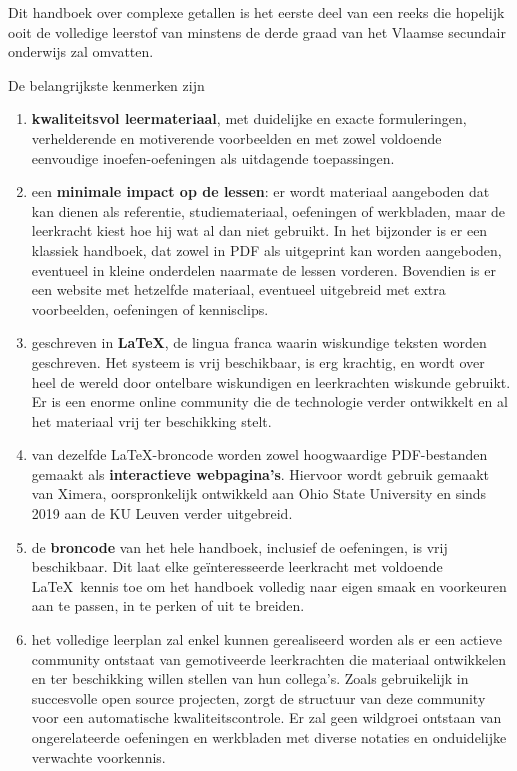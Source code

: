 \documentclass{ximera}
\begin{document}
	\author{Wim Obbels}
	\label{xim:xuitleg_leerkrachten}

    Dit handboek over complexe getallen is het eerste deel van een reeks die hopelijk ooit de volledige leerstof van minstens de derde graad van het Vlaamse secundair onderwijs zal omvatten.

    De belangrijkste kenmerken zijn
    \begin{enumerate}
        \item \textbf{kwaliteitsvol leermateriaal}, met duidelijke en exacte formuleringen, verhelderende en motiverende voorbeelden en met zowel voldoende eenvoudige inoefen-oefeningen als uitdagende toepassingen.
        \item een \textbf{minimale impact op de lessen}: er wordt materiaal aangeboden dat kan dienen als referentie, studiemateriaal, oefeningen of werkbladen, maar de leerkracht kiest hoe hij wat al dan niet gebruikt. In het bijzonder is er een klassiek handboek, dat zowel in PDF als uitgeprint kan worden aangeboden, eventueel in kleine onderdelen naarmate de lessen vorderen. Bovendien is er een website met hetzelfde materiaal, eventueel uitgebreid met extra voorbeelden, oefeningen of kennisclips.
        \item geschreven in \textbf{\LaTeX}, de lingua franca waarin wiskundige teksten worden geschreven. Het systeem is vrij beschikbaar, is erg krachtig, en wordt over heel de wereld door ontelbare wiskundigen en leerkrachten wiskunde gebruikt. Er is een enorme online community die de technologie verder ontwikkelt en al het materiaal vrij ter beschikking stelt.
        \item van dezelfde \LaTeX-broncode worden zowel hoogwaardige PDF-bestanden gemaakt als \textbf{interactieve webpagina's}. Hiervoor wordt gebruik gemaakt van Ximera, oorspronkelijk ontwikkeld aan Ohio State University en sinds 2019 aan de KU Leuven verder uitgebreid.
        \item de \textbf{broncode} van het hele handboek, inclusief de oefeningen, is vrij beschikbaar. Dit laat elke geïnteresseerde leerkracht met voldoende \LaTeX\ kennis toe om het handboek volledig naar eigen smaak en voorkeuren aan te passen, in te perken of uit te breiden.
        \item het volledige leerplan zal enkel kunnen gerealiseerd worden als er een actieve community ontstaat van gemotiveerde leerkrachten die materiaal ontwikkelen en ter beschikking willen stellen van hun collega's. Zoals gebruikelijk in succesvolle open source projecten, zorgt de structuur van deze community voor een automatische kwaliteitscontrole. Er zal geen wildgroei ontstaan van ongerelateerde oefeningen en werkbladen met diverse notaties en onduidelijke verwachte voorkennis. 

\end{enumerate}
\end{document}
